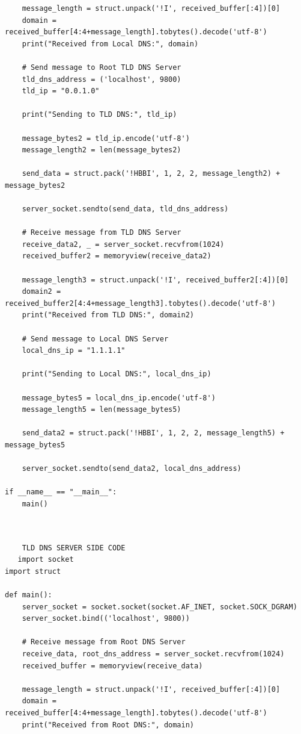 \documentclass[11pt]{article}
\begin{document}
\begin{itemize}
\begin{itemize}
\begin{verbatim}
    message_length = struct.unpack('!I', received_buffer[:4])[0]
    domain = received_buffer[4:4+message_length].tobytes().decode('utf-8')
    print("Received from Local DNS:", domain)

    # Send message to Root TLD DNS Server
    tld_dns_address = ('localhost', 9800)
    tld_ip = "0.0.1.0"

    print("Sending to TLD DNS:", tld_ip)

    message_bytes2 = tld_ip.encode('utf-8')
    message_length2 = len(message_bytes2)

    send_data = struct.pack('!HBBI', 1, 2, 2, message_length2) + message_bytes2

    server_socket.sendto(send_data, tld_dns_address)

    # Receive message from TLD DNS Server
    receive_data2, _ = server_socket.recvfrom(1024)
    received_buffer2 = memoryview(receive_data2)

    message_length3 = struct.unpack('!I', received_buffer2[:4])[0]
    domain2 = received_buffer2[4:4+message_length3].tobytes().decode('utf-8')
    print("Received from TLD DNS:", domain2)

    # Send message to Local DNS Server
    local_dns_ip = "1.1.1.1"

    print("Sending to Local DNS:", local_dns_ip)

    message_bytes5 = local_dns_ip.encode('utf-8')
    message_length5 = len(message_bytes5)

    send_data2 = struct.pack('!HBBI', 1, 2, 2, message_length5) + message_bytes5

    server_socket.sendto(send_data2, local_dns_address)

if __name__ == "__main__":
    main()

   
\end{verbatim}
 \begin{verbatim}
    TLD DNS SERVER SIDE CODE
   import socket
import struct

def main():
    server_socket = socket.socket(socket.AF_INET, socket.SOCK_DGRAM)
    server_socket.bind(('localhost', 9800))

    # Receive message from Root DNS Server
    receive_data, root_dns_address = server_socket.recvfrom(1024)
    received_buffer = memoryview(receive_data)

    message_length = struct.unpack('!I', received_buffer[:4])[0]
    domain = received_buffer[4:4+message_length].tobytes().decode('utf-8')
    print("Received from Root DNS:", domain)


\end{verbatim}
\end{itemize}
\end{itemize}
\end{document}
